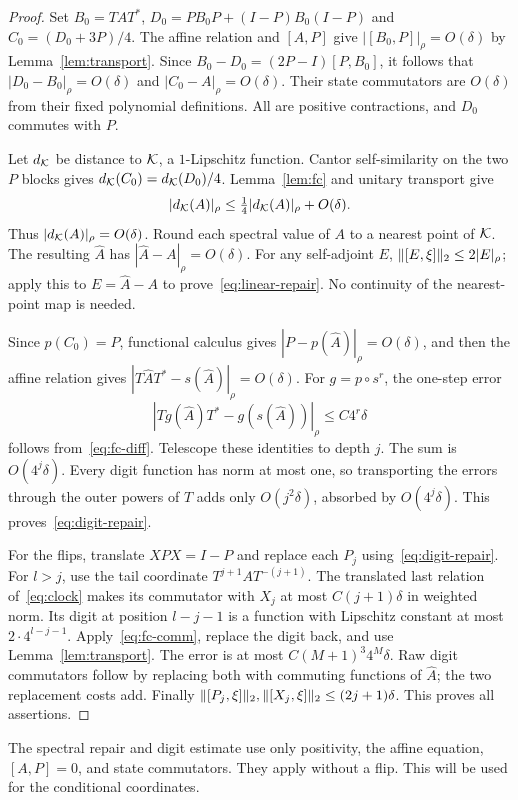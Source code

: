 \begin{proof}
Set $B_0=TAT^*$, $D_0=PB_0P+(I-P)B_0(I-P)$ and $C_0=(D_0+3P)/4$. The affine relation and $[A,P]$ give $|[B_0,P]|_\rho=O(\delta)$ by Lemma~\ref{lem:transport}. Since $B_0-D_0=(2P-I)[P,B_0]$, it follows that $|D_0-B_0|_\rho=O(\delta)$ and $|C_0-A|_\rho=O(\delta)$. Their state commutators are $O(\delta)$ from their fixed polynomial definitions. All are positive contractions, and $D_0$ commutes with $P$.

Let $d_\mathcal K$ be distance to $\mathcal K$, a $1$-Lipschitz function. Cantor self-similarity on the two $P$ blocks gives $d_\mathcal K(C_0)=d_\mathcal K(D_0)/4$. Lemma~\ref{lem:fc} and unitary transport give
\[
 |d_\mathcal K(A)|_\rho\le\tfrac14|d_\mathcal K(A)|_\rho+O(\delta).
\]
Thus $|d_\mathcal K(A)|_\rho=O(\delta)$. Round each spectral value of $A$ to a nearest point of $\mathcal K$. The resulting $\widehat A$ has $|\widehat A-A|_\rho=O(\delta)$. For any self-adjoint $E$, $\lVert[E,\xi]\rVert_2\le2|E|_\rho$; apply this to $E=\widehat A-A$ to prove~\eqref{eq:linear-repair}. No continuity of the nearest-point map is needed.

Since $p(C_0)=P$, functional calculus gives $|P-p(\widehat A)|_\rho=O(\delta)$, and then the affine relation gives $|T\widehat AT^*-s(\widehat A)|_\rho=O(\delta)$. For $g=p\circ s^r$, the one-step error
\[
 |Tg(\widehat A)T^*-g(s(\widehat A))|_\rho\le C4^r\delta
\]
follows from~\eqref{eq:fc-diff}. Telescope these identities to depth $j$. The sum is $O(4^j\delta)$. Every digit function has norm at most one, so transporting the errors through the outer powers of $T$ adds only $O(j^2\delta)$, absorbed by $O(4^j\delta)$. This proves~\eqref{eq:digit-repair}.

For the flips, translate $XPX=I-P$ and replace each $P_j$ using~\eqref{eq:digit-repair}. For $l>j$, use the tail coordinate $T^{j+1}AT^{-(j+1)}$. The translated last relation of~\eqref{eq:clock} makes its commutator with $X_j$ at most $C(j+1)\delta$ in weighted norm. Its digit at position $l-j-1$ is a function with Lipschitz constant at most $2\cdot4^{l-j-1}$. Apply~\eqref{eq:fc-comm}, replace the digit back, and use Lemma~\ref{lem:transport}. The error is at most $C(M+1)^3 4^M\delta$. Raw digit commutators follow by replacing both with commuting functions of $\widehat A$; the two replacement costs add. Finally $\lVert[P_j,\xi]\rVert_2,\lVert[X_j,\xi]\rVert_2\le(2j+1)\delta$. This proves all assertions.
\end{proof}

\begin{remark}\label{rem:affine-only}
The spectral repair and digit estimate use only positivity, the affine equation, $[A,P]=0$, and state commutators. They apply without a flip. This will be used for the conditional coordinates.
\end{remark}


